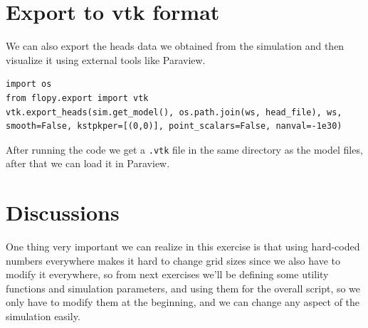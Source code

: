 \documentclass[titlepage,12pt]{unisubmission}
\begin{document}
\section{Export to vtk format}
\label{sec:org14b5dfd}

We can also export the heads data we obtained from the simulation and then visualize it using external tools like Paraview.

\begin{verbatim}
import os
from flopy.export import vtk
vtk.export_heads(sim.get_model(), os.path.join(ws, head_file), ws, smooth=False, kstpkper=[(0,0)], point_scalars=False, nanval=-1e30)
\end{verbatim}

After running the code we get a \texttt{.vtk} file in the same directory as the model files, after that we can load it in Paraview.

\section{Discussions}
\label{sec:org7263ad8}
One thing very important we can realize in this exercise is that using hard-coded numbers everywhere makes it hard to change grid sizes since we also have to modify it everywhere, so from next exercises we'll be defining some utility functions and simulation parameters, and using them for the overall script, so we only have to modify them at the beginning, and we can change any aspect of the simulation easily.
\end{document}
